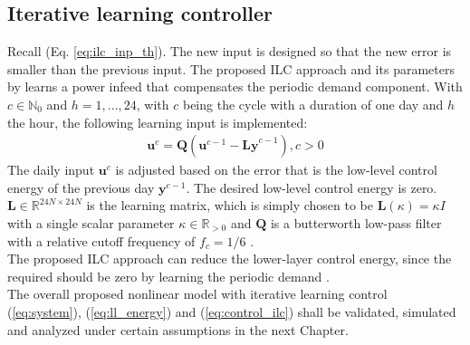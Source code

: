\subsection{Iterative learning controller}
\label{subsec:hlc}
Recall (Eq. \ref{eq:ilc_inp_th}). The new input is designed so that the new error is smaller than the previous input. The proposed ILC approach and its parameters by \cite{paperilc} learns a power infeed that compensates the periodic demand component. With $c \in \mathbb{N}_0$ and $h=1,...,24$, with $c$ being the cycle with a duration of one day and $h$ the hour, the following learning input is implemented: 
\begin{align}
\label{eq:control_ilc}
\textbf{u}^c = \textbf{Q}(\textbf{u}^{c-1} - \textbf{Ly}^{c-1}), c > 0
\end{align}
The daily input $\textbf{u}^c$ is adjusted based on the error that is the low-level control energy of the previous day $\textbf{y}^{c-1}$. The desired low-level control energy is zero. $\textbf{L} \in \mathbb{R}^{24N\times 24N}$ is the learning matrix, which is simply chosen to be $\textbf{L}(\kappa) = \kappa I$ with a single scalar parameter $\kappa \in \mathbb{R}_{>0}$ and $\textbf{Q}$ is a butterworth low-pass filter with a relative cutoff frequency of $f_c = 1/6$ \cite{paperilc}. 
\\The proposed ILC approach can reduce the lower-layer control energy, since the required should be zero by learning the periodic demand \cite{paperilc}.
\\The overall proposed nonlinear model with iterative learning control (\ref{eq:system}), (\ref{eq:ll_energy}) and (\ref{eq:control_ilc}) shall be validated, simulated and analyzed under certain assumptions in the next Chapter.

